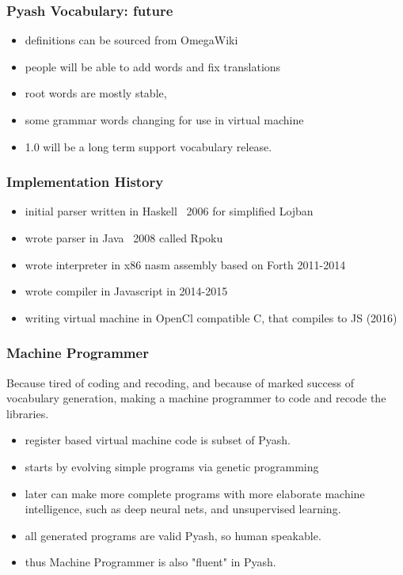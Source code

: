 \documentclass{beamer}
\begin{document}
\begin{frame}
  \frametitle{Pyash Vocabulary: future}
  \begin{itemize}
    \item definitions can be sourced from OmegaWiki
    \item people will be able to add words and fix translations
    \item root words are mostly stable, 
    \item some grammar words changing for use in virtual machine
    \item 1.0 will be a long term support vocabulary release. 
  \end{itemize}
\end{frame}

\begin{frame}
  \frametitle{Implementation History}
  \begin{itemize}
    \item initial parser written in Haskell ~2006 for simplified Lojban
    \item wrote parser in Java ~2008 called Rpoku
    \item wrote interpreter in x86 nasm assembly based on Forth 2011-2014
    \item wrote compiler in Javascript in 2014-2015
    \item writing virtual machine in OpenCl compatible C, that compiles to JS
          (2016)
  \end{itemize}
\end{frame}

\begin{frame}
  \frametitle{Machine Programmer}
  Because tired of coding and recoding, and because of marked success of
  vocabulary generation, making a machine programmer to code and recode the
  libraries. 
  \begin{itemize}
    \item register based virtual machine code is subset of Pyash.
    \item starts by evolving simple programs via genetic programming
    \item later can make more complete programs with more elaborate machine
          intelligence, such as deep neural nets, and unsupervised learning. 
    \item all generated programs are valid Pyash, so human speakable. 
    \item thus Machine Programmer is also "fluent" in Pyash. 
  \end{itemize}
\end{frame}
\end{document}
